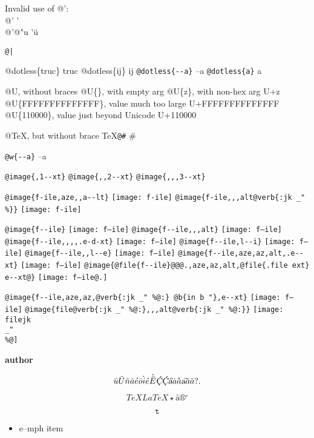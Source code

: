\documentclass{book}
\renewcommand{\includegraphics}[1]{\fbox{FIG #1}}
\begin{document}
\begin{titlepage}
Invalid use of @':\leavevmode{}\\
@' \'{}
\leavevmode{}\\
@'@"u \'{}\"{u}

\texttt{@|} 

@dotless\{truc\} truc
@dotless\{ij\} ij
\texttt{@dotless\{{-}{-}a\}} --a
\texttt{@dotless\{a\}} a

@U, without braces @U\{\}, with empty arg 
@U\{z\}, with non-hex arg U+z
@U\{FFFFFFFFFFFFFF\}, value much too large U+FFFFFFFFFFFFFF
@U\{110000\}, value just beyond Unicode U+110000

@TeX, but without brace \TeX{}\texttt{@\#} \#

\texttt{@w\{{-}{-}a\}} \hbox{--a}

\texttt{@image\{,1{-}{-}xt\}} 
\texttt{@image\{,,2{-}{-}xt\}} 
\texttt{@image\{,,,3{-}{-}xt\}} 

\texttt{@image\{f-ile,aze,,a{-}{-}lt\}} \texttt{[image: f-ile]}
\texttt{@image\{f-ile,,,alt@verb\{:jk \_" \%\@\}\}} \texttt{[image: f-ile]}

\texttt{@image\{f{-}{-}ile\}} \texttt{[image: f--ile]}
\texttt{@image\{f{-}{-}ile,,,alt\}} \texttt{[image: f--ile]}
\texttt{@image\{f{-}{-}ile,,,,.e-d-xt\}} \texttt{[image: f--ile]}
\texttt{@image\{f{-}{-}ile,l{-}{-}i\}} \texttt{[image: f--ile]}
\texttt{@image\{f{-}{-}ile,,l{-}{-}e\}} \texttt{[image: f--ile]}
\texttt{@image\{f{-}{-}ile,aze,az,alt,.e{-}{-}xt\}} \texttt{[image: f--ile]}
\texttt{@image\{@file\{f{-}{-}ile\}@@@.,aze,az,alt,@file\{.file ext\} e{-}{-}xt@\}} \texttt{[image: f--ile@.]}

\texttt{@image\{f{-}{-}ile,aze,az,@verb\{:jk \_" \%@:\} @b\{in b "\},e{-}{-}xt\}} \texttt{[image: f--ile]}
\texttt{@image\{file@verb\{:jk \_" \%@:\},,,alt@verb\{:jk \_" \%@:\}\}} \texttt{[image: filejk \\\_" \\\%@]}


{\bfseries author}%

$$
\ddot{u} \ddot{U} \tilde{n} \hat{a} \acute{e} \bar{o} \grave{i} \acute{e} \grave{\bar{E}}
\textsl{\c{\'{C}}} \textsl{\c{\'{C}}} \textsl{\H{a}} \dot{a} \mathring{a} \textsl{\t{a}}
\breve{a} \check{a}
 ? .
$$

$$
TeX LaTeX \star{} \mathord{\text{\aa{}}} \circledR{} ^{\circ{}} 
$$

$$
\mathtt{t} 
$$

\begin{itemize}[label=\emph{}]
\item e--mph item
\end{itemize}


\end{titlepage}
\end{document}
